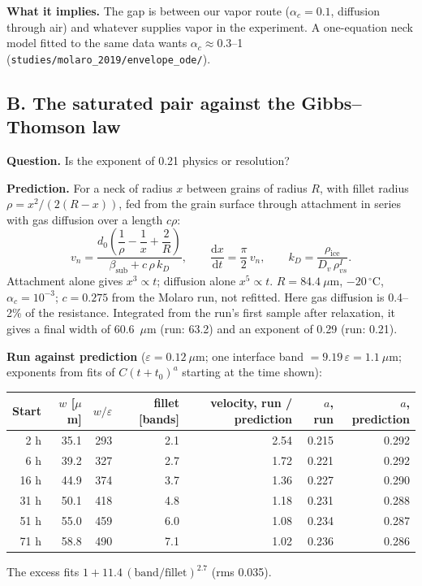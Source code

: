 \documentclass[11pt]{article}
\begin{document}
\textbf{What it implies.} The gap is between our vapor route ($\alpha_c =
0.1$, diffusion through air) and whatever supplies vapor in the experiment.
A one-equation neck model fitted to the same data wants $\alpha_c \approx
0.3$--1 (\texttt{studies/molaro\_2019/envelope\_ode/}).

\subsection*{B. The saturated pair against the Gibbs--Thomson law}

\textbf{Question.} Is the exponent of 0.21 physics or resolution?

\textbf{Prediction.} For a neck of radius $x$ between grains of radius $R$,
with fillet radius $\rho = x^{2}/(2(R-x))$, fed from the grain surface
through attachment in series with gas diffusion over a length $c\rho$:
\[
v_n = \frac{d_0\left(\dfrac1\rho - \dfrac1x + \dfrac2R\right)}{\beta_{\mathrm{sub}} + c\,\rho\,k_D},\qquad
\frac{\mathrm dx}{\mathrm dt} = \frac{\pi}{2}\,v_n,\qquad k_D = \frac{\rho_{\mathrm{ice}}}{D_v\,\rho_{vs}^{I}} .
\]
Attachment alone gives $x^{3} \propto t$; diffusion alone $x^{5} \propto t$.
$R = 84.4~\mu$m, $-20\,^{\circ}$C, $\alpha_c = 10^{-3}$; $c = 0.275$ from the
Molaro run, not refitted. Here gas diffusion is 0.4--2\% of the resistance.
Integrated from the run's first sample after relaxation, it gives a final
width of 60.6~$\mu$m (run: 63.2) and an exponent of 0.29 (run: 0.21).

\textbf{Run against prediction} ($\varepsilon = 0.12~\mu$m; one interface
band $= 9.19\,\varepsilon = 1.1~\mu$m; exponents from fits of
$C(t+t_0)^{a}$ starting at the time shown):
\begin{center}\small\begin{tabular}{rrrrrrr}\toprule
Start & $w$ [$\mu$m] & $w/\varepsilon$ & fillet [bands] & velocity, run / prediction & $a$, run & $a$, prediction\\\midrule
2 h & 35.1 & 293 & 2.1 & 2.54 & 0.215 & 0.292\\
6 h & 39.2 & 327 & 2.7 & 1.72 & 0.221 & 0.292\\
16 h & 44.9 & 374 & 3.7 & 1.36 & 0.227 & 0.290\\
31 h & 50.1 & 418 & 4.8 & 1.18 & 0.231 & 0.288\\
51 h & 55.0 & 459 & 6.0 & 1.08 & 0.234 & 0.287\\
71 h & 58.8 & 490 & 7.1 & 1.02 & 0.236 & 0.286\\\bottomrule
\end{tabular}\end{center}
The excess fits $1 + 11.4\,(\text{band}/\text{fillet})^{2.7}$ (rms 0.035).
\end{document}
